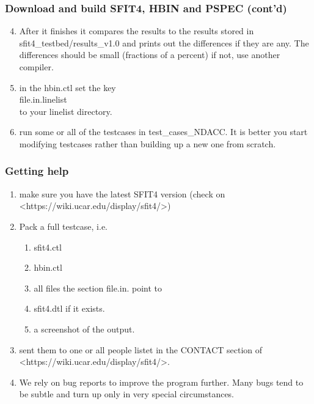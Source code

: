 \documentclass[notes=hide]{beamer}
\begin{document}
\begin{frame}
  \frametitle{Download and build SFIT4, HBIN and PSPEC (cont'd)}
  \begin{enumerate}
    \setcounter{enumi}{3}
  \item After it finishes it compares the results to the results
    stored in sfit4\_testbed/results\_v1.0 and prints out the differences
    if they are any. The differences should be small (fractions of a
    percent) if not, use another compiler.
  \item in the hbin.ctl set the key\\
    file.in.linelist\\
    to your linelist directory.
  \item run some or all of the testcases in test\_cases\_NDACC. It is
    better you start modifying testcases rather than building up a new
    one from scratch.
  \end{enumerate}
\end{frame}


\begin{frame}
  \frametitle{Getting help}
  \begin{enumerate}
  \item make sure you have the latest SFIT4 version (check on <https://wiki.ucar.edu/display/sfit4/>)
  \item Pack a full testcase, i.e.
    \begin{enumerate}
    \item sfit4.ctl
    \item hbin.ctl
    \item all files the section file.in. point to
    \item sfit4.dtl if it exists.
    \item a screenshot of the output.
    \end{enumerate}
  \item sent them to one or all people listet in the CONTACT section
    of <https://wiki.ucar.edu/display/sfit4/>.
  \item We rely on bug reports to improve the program further. Many
    bugs tend to be subtle and turn up only in very special
    circumstances.
  \end{enumerate}

\end{frame}
\end{document}
